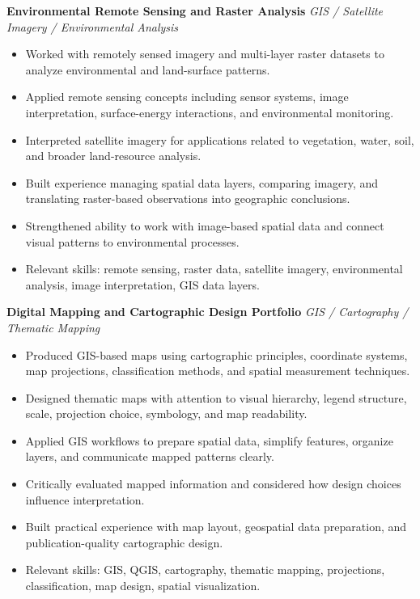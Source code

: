 \documentclass[10.5pt,letterpaper]{article}
\begin{document}
\textbf{Environmental Remote Sensing and Raster Analysis} \hfill \textit{GIS / Satellite Imagery / Environmental Analysis}\par
\begin{itemize}
\item Worked with remotely sensed imagery and multi-layer raster datasets to analyze environmental and land-surface patterns.
\item Applied remote sensing concepts including sensor systems, image interpretation, surface-energy interactions, and environmental monitoring.
\item Interpreted satellite imagery for applications related to vegetation, water, soil, and broader land-resource analysis.
\item Built experience managing spatial data layers, comparing imagery, and translating raster-based observations into geographic conclusions.
\item Strengthened ability to work with image-based spatial data and connect visual patterns to environmental processes.
\item Relevant skills: remote sensing, raster data, satellite imagery, environmental analysis, image interpretation, GIS data layers.
\end{itemize}
\textbf{Digital Mapping and Cartographic Design Portfolio} \hfill \textit{GIS / Cartography / Thematic Mapping}\par
\begin{itemize}
\item Produced GIS-based maps using cartographic principles, coordinate systems, map projections, classification methods, and spatial measurement techniques.
\item Designed thematic maps with attention to visual hierarchy, legend structure, scale, projection choice, symbology, and map readability.
\item Applied GIS workflows to prepare spatial data, simplify features, organize layers, and communicate mapped patterns clearly.
\item Critically evaluated mapped information and considered how design choices influence interpretation.
\item Built practical experience with map layout, geospatial data preparation, and publication-quality cartographic design.
\item Relevant skills: GIS, QGIS, cartography, thematic mapping, projections, classification, map design, spatial visualization.
\end{itemize}
\end{document}
